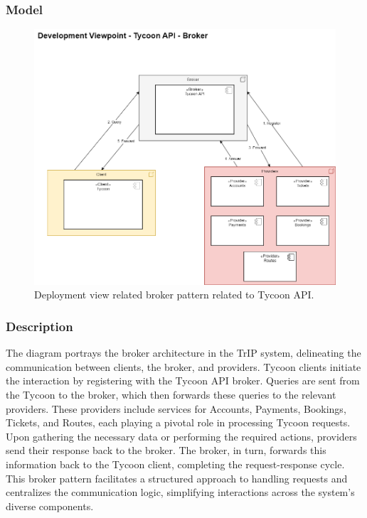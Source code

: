 \subsubsection{Model}
\begin{figure}[H]
    \centering
    \includegraphics[width=\textwidth]{drawings/views_final_version/development_view_broker.png}
    \caption{Deployment view related broker pattern related to Tycoon API.}
    \label{fig:development_view_broker}
\end{figure}
\subsubsection{Description}
The diagram portrays the broker architecture in the TrIP system, delineating the communication between clients, the broker, and providers. Tycoon clients initiate the interaction by registering with the Tycoon API broker. Queries are sent from the Tycoon to the broker, which then forwards these queries to the relevant providers. These providers include services for Accounts, Payments, Bookings, Tickets, and Routes, each playing a pivotal role in processing Tycoon requests. Upon gathering the necessary data or performing the required actions, providers send their response back to the broker. The broker, in turn, forwards this information back to the Tycoon client, completing the request-response cycle. This broker pattern facilitates a structured approach to handling requests and centralizes the communication logic, simplifying interactions across the system’s diverse components.
